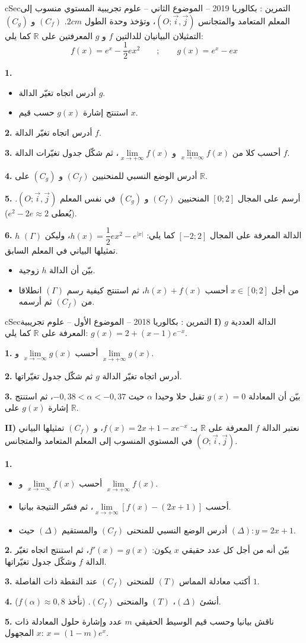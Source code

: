 \documentclass[12pt,a4paper]{article}
\newenvironment{BOX}[2]{\begin{otherlanguage}{english}\begin{arbox}{#1}{#2}}{\end{arbox}\end{otherlanguage}}
\newcounter{exo}
\newenvironment{tamrin}[1]{\stepcounter{exo}\begin{BOX}{cSec}{التمرين \theexo: #1}}{\end{BOX}}
\newcommand{\R}{\mathbb{R}}
\newenvironment{sq}{\begin{itemize}[leftmargin=2.4em,itemsep=3pt]}{\end{itemize}}
\newcommand{\qa}{\item[(أ)]}\newcommand{\qb}{\item[(ب)]}\newcommand{\qc}{\item[(جـ)]}\newcommand{\qd}{\item[(د)]}\newcommand{\qe}{\item[(هـ)]}
\newcommand{\QQ}[1]{\par\smallskip\textbf{#1.} }
\begin{document}
\begin{tamrin}{بكالوريا 2019 -- الموضوع الثاني -- علوم تجريبية}
المستوي منسوب إلى المعلم المتعامد والمتجانس $(O;\vec i,\vec j)$، وتؤخذ وحدة الطول $2cm$.
$(C_f)$ و $(C_g)$ التمثيلان البيانيان للدالتين $f$ و $g$ المعرفتين على $\R$ كما يلي:
\[f(x)=e^{x}-\frac12ex^{2}\qquad;\qquad g(x)=e^{x}-ex\]
\QQ{1}
\begin{sq}
\qa أدرس اتجاه تغيّر الدالة $g$.
\qb استنتج إشارة $g(x)$ حسب قيم $x$.
\end{sq}
\QQ{2} أدرس اتجاه تغيّر الدالة $f$.
\QQ{3} أحسب كلا من $\lim\limits_{x\to-\infty}f(x)$ و $\lim\limits_{x\to+\infty}f(x)$، ثم شكّل جدول تغيّرات الدالة $f$.
\QQ{4} أدرس الوضع النسبي للمنحنيين $(C_f)$ و $(C_g)$ على $\R$.
\QQ{5} أرسم على المجال $[0;2]$ المنحنيين $(C_f)$ و $(C_g)$ في نفس المعلم $(O;\vec i,\vec j)$. (يُعطى $e^{2}-2e\approx2$).
\QQ{6} $h$ الدالة المعرفة على المجال $[-2;2]$ كما يلي: $h(x)=\dfrac12ex^{2}-e^{|x|}$، وليكن $(\Gamma)$ تمثيلها البياني في المعلم السابق.
\begin{sq}
\qa بيّن أن الدالة $h$ زوجية.
\qb من أجل $x\in[0;2]$ أحسب $h(x)+f(x)$، ثم استنتج كيفية رسم $(\Gamma)$ انطلاقا من $(C_f)$ ثم أرسمه.
\end{sq}
\end{tamrin}

\begin{tamrin}{بكالوريا 2018 -- الموضوع الأول -- علوم تجريبية}
\textbf{I)} $g$ الدالة العددية المعرفة على $\R$ كما يلي: $g(x)=2+(x-1)e^{-x}$.
\QQ{1} أحسب $\lim\limits_{x\to-\infty}g(x)$ و $\lim\limits_{x\to+\infty}g(x)$.
\QQ{2} أدرس اتجاه تغيّر الدالة $g$ ثم شكّل جدول تغيّراتها.
\QQ{3} بيّن أن المعادلة $g(x)=0$ تقبل حلا وحيدا $\alpha$ حيث $-0{,}38<\alpha<-0{,}37$، ثم استنتج إشارة $g(x)$ على $\R$.

\textbf{II)} نعتبر الدالة $f$ المعرفة على $\R$ بـ: $f(x)=2x+1-xe^{-x}$، و $(C_f)$ تمثيلها البياني في المستوي المنسوب إلى المعلم المتعامد والمتجانس $(O;\vec i,\vec j)$.
\QQ{1}
\begin{sq}
\qa أحسب $\lim\limits_{x\to-\infty}f(x)$ و $\lim\limits_{x\to+\infty}f(x)$.
\qb أحسب $\lim\limits_{x\to+\infty}\left[f(x)-(2x+1)\right]$، ثم فسّر النتيجة بيانيا.
\qc أدرس الوضع النسبي للمنحنى $(C_f)$ والمستقيم $(\Delta)$ حيث $(\Delta):y=2x+1$.
\end{sq}
\QQ{2} بيّن أنه من أجل كل عدد حقيقي $x$ يكون: $f'(x)=g(x)$، ثم استنتج اتجاه تغيّر الدالة $f$ وشكّل جدول تغيّراتها.
\QQ{3} أكتب معادلة المماس $(T)$ للمنحنى $(C_f)$ عند النقطة ذات الفاصلة $1$.
\QQ{4} أنشئ $(\Delta)$، $(T)$ والمنحنى $(C_f)$. (نأخذ $f(\alpha)\approx0{,}8$).
\QQ{5} ناقش بيانيا وحسب قيم الوسيط الحقيقي $m$ عدد وإشارة حلول المعادلة ذات المجهول $x$: $x=(1-m)e^{x}$.
\end{tamrin}
\end{document}
